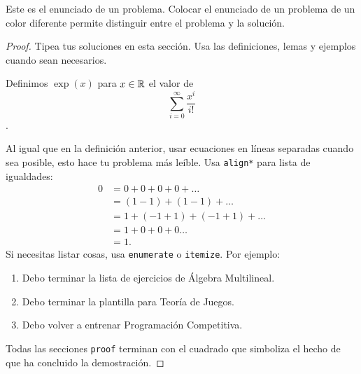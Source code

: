 
\begin{statement}{1}
    Este es el enunciado de un problema.
    Colocar el enunciado de un problema de un color diferente
    permite distinguir entre el problema y la soluci\'on.
\end{statement}

\begin{proof}
    Tipea tus soluciones en esta secci\'on.
    Usa las definiciones, lemas y ejemplos cuando sean necesarios.
    \begin{defn}
        Definimos \(\exp(x)\) para \(x \in \mathbb{R}\) el valor de \[\sum_{i = 0}^\infty\frac{x^i}{i!}\].
    \end{defn}
    Al igual que en la definici\'on anterior,
    usar ecuaciones en l\'ineas separadas cuando sea posible,
    esto hace tu problema m\'as le\'ible. Usa \texttt{align*} para lista de igualdades:
    \begin{align*}
        0 &= 0 + 0 + 0 + 0 + \dots\\
        &= (1 - 1) + (1 - 1) + \dots \\
        &= 1 + (-1 + 1) + (-1 + 1) + \dots \\
        &= 1 + 0 + 0 + 0 \dots \\
        &= 1.
    \end{align*}
    Si necesitas listar cosas, usa \texttt{enumerate} o \texttt{itemize}. Por ejemplo:
    \begin{enumerate}
        \item Debo terminar la lista de ejercicios de \'Algebra Multilineal.
        \item Debo terminar la plantilla para Teor\'ia de Juegos.
        \item Debo volver a entrenar Programaci\'on Competitiva.
    \end{enumerate}
    Todas las secciones \texttt{proof} terminan con el cuadrado que simboliza el hecho de que ha concluido la demostraci\'on.
\end{proof}